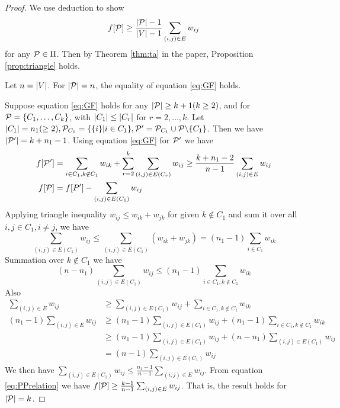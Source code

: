 \documentclass{article}
\begin{document}

\begin{proof}

We use deduction to show  
\begin{equation}\label{eq:GF}
f[\P] \geq \frac{\abs{\P}-1}{\abs{V}-1} \sum_{(i,j) \in E} w_{ij}
\end{equation}
for any $\P \in \Pi$. Then by Theorem \ref{thm:ta} in the paper, Proposition \ref{prop:triangle} holds. 

Let $n=\abs{V}$. For $\abs{\P}=n$, the equality of equation \ref{eq:GF} holds. 

Suppose equation \eqref{eq:GF} holds for any $\abs{\P} \geq k+1(k\geq 2)$, and for $\P=\{C_1, \dots, C_k\}$, with $\abs{C_1} \leq \abs{C_r}$ for $r=2,\dots, k$. Let $\abs{C_1}=n_1(\geq 2), \P_{C_1} = \{\{i\}| i \in C_1\}, \P'=\P_{C_1} \cup \P \backslash \{C_1\}$. Then we have $\abs{\P'} = k+n_1-1$. Using equation \eqref{eq:GF} for $\P'$ we have
\begin{align}\label{eq:PPrelation}
f[\P'] & = \sum_{i\in C_1, k \not\in C_1} w_{ik} + \sum_{r=2}^k \sum_{(i,j) \in E(C_r)} w_{ij}\geq \frac{k+n_1 -2}{n-1}\sum_{(i,j) \in E} w_{ij} \\
f[\P] & =f[P'] - \sum_{(i,j) \in E(C_1)} w_{ij}
\end{align}
Applying triangle inequality $w_{ij} \leq w_{ik} + w_{jk}$ for given $k\not\in C_1$ and sum it over all $i, j \in C_1, i\neq j$, we have
$$
\sum_{(i,j) \in E(C_1)} w_{ij} \leq \sum_{(i,j) \in E(C_1)} (w_{ik} + w_{jk}) = (n_1-1)\sum_{i\in C_1} w_{ik}
$$
Summation over $k \not\in C_1$ we have 
$$
(n - n_1) \sum_{(i,j) \in E(C_1)} w_{ij} \leq (n_1 - 1) \sum_{i \in C_1, k \not\in C_1} w_{ik}
$$
Also
\begin{align*}
\sum_{(i,j) \in E} w_{ij}  & \geq \sum_{(i,j) \in E(C_1)} w_{ij} + \sum_{i\in C_1, k\not\in C_1} w_{ik} \\
(n_1 - 1)\sum_{(i,j) \in E} w_{ij}  & \geq (n_1 -1 )\sum_{(i,j) \in E(C_1)} w_{ij} + (n_1-1)\sum_{i\in C_1, k\not\in C_1} w_{ik} \\
& \geq (n_1 -1 )\sum_{(i,j) \in E(C_1)} w_{ij} + (n - n_1) \sum_{(i,j) \in E(C_1)} w_{ij}\\
& = (n-1) \sum_{(i,j) \in E(C_1)} w_{ij}
\end{align*}
We then have $\sum_{(i,j) \in E(C_1)} w_{ij} \leq \frac{n_1-1}{n-1}\sum_{(i,j) \in E} w_{ij}$. From equation \eqref{eq:PPrelation} we have 
$f[\P] \geq \frac{k-1}{n-1}\sum_{(i,j) \in E} w_{ij}$. That is, the result holds for $\abs{\P}=k$.
\end{proof}
\end{document}

